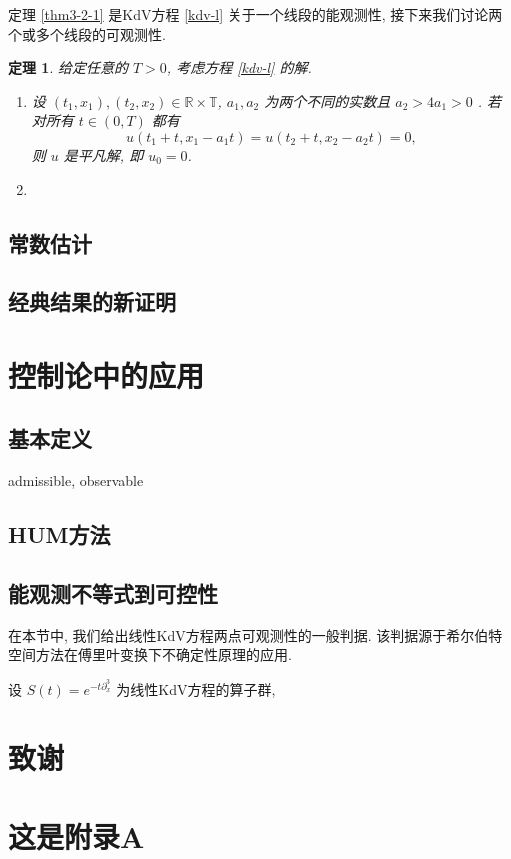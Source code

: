 \documentclass[master]{cugthesis}
\newcommand\R{\ensuremath{\mathbb{R}}}
\newcommand\T{\ensuremath{\mathbb{T}}}
\newtheorem{theorem}{定理}[chapter]
\begin{document}
    定理 \ref{thm3-2-1} 是KdV方程 \eqref{kdv-l} 关于一个线段的能观测性, 接下来我们讨论两个或多个线段的可观测性.
    
    \begin{theorem}
    给定任意的 $T>0$, 考虑方程 \eqref{kdv-l} 的解.
\begin{enumerate}
    \item [\rm{(1)}] 设 $(t_1,x_1), (t_2,x_2)\in \R\times \T$, $a_1,a_2$ 为两个不同的实数且 $a_2>4a_1>0$ . 若对所有 $t\in (0,T)$ 都有
    \begin{equation*}
        u(t_1+t,x_1-a_1t)=u(t_2+t,x_2-a_2t)=0,
    \end{equation*}
    则 $u$ 是平凡解, 即 $u_0=0$. 
    \item [\rm{(2)}] 
\end{enumerate}
    \end{theorem}
    
    \section{常数估计}
    \section{经典结果的新证明}
    
    
    \chapter{控制论中的应用}
    \section{基本定义}
    admissible, observable
    \section{HUM方法}
    \section{能观测不等式到可控性}
    
    在本节中, 我们给出线性KdV方程两点可观测性的一般判据. 该判据源于希尔伯特空间方法在傅里叶变换下不确定性原理的应用.
    
    设 $S(t)=e^{-t\partial_x^3}$ 为线性KdV方程的算子群,
    

    \backmatter
    \chapter{致谢}

    \appendix
    \chapter{这是附录A}
\end{document}
